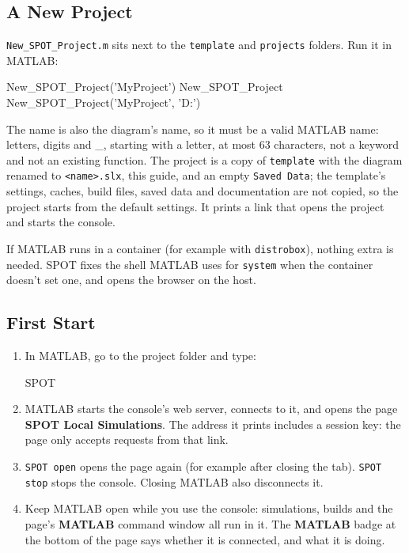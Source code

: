 \documentclass[11pt,a4paper]{article}
\newcommand{\ui}[1]{\textsf{\textbf{#1}}}
\newcommand{\pth}[1]{\texttt{#1}}
\newcommand{\fn}[1]{\texttt{#1}}
\begin{document}
\subsection{A New Project}\label{sec:newproject}
\fn{New\_SPOT\_Project.m} sits next to the \pth{template} and \pth{projects} folders. Run it in MATLAB:
\begin{matlab}
New_SPOT_Project('MyProject')              %
New_SPOT_Project                           %
New_SPOT_Project('MyProject', 'D:\SPOT')   %
\end{matlab}
The name is also the diagram's name, so it must be a valid MATLAB name: letters, digits and \_, starting with a
letter, at most 63 characters, not a keyword and not an existing function. The project is a copy of
\pth{template} with the diagram renamed to \pth{<name>.slx}, this guide, and an empty \pth{Saved Data}; the
template's settings, caches, build files, saved data and documentation are not copied, so the project starts from
the default settings. It prints a link that opens the project and starts the console.
\begin{tipbox}
If MATLAB runs in a container (for example with \pth{distrobox}), nothing extra is needed. SPOT fixes the shell
MATLAB uses for \fn{system} when the container doesn't set one, and opens the browser on the host.
\end{tipbox}

\subsection{First Start}\label{sec:firststart}
\begin{enumerate}
  \item In MATLAB, go to the project folder and type:
\begin{matlab}
SPOT          %
\end{matlab}
  \item MATLAB starts the console's web server, connects to it, and opens the page \ui{SPOT Local Simulations}.
        The address it prints includes a session key: the page only accepts requests from that link.
  \item \fn{SPOT open} opens the page again (for example after closing the tab). \fn{SPOT stop} stops the console.
        Closing MATLAB also disconnects it.
  \item Keep MATLAB open while you use the console: simulations, builds and the page's \ui{MATLAB} command window
        all run in it. The \ui{MATLAB} badge at the bottom of the page says whether it is connected, and what it is doing.
\end{enumerate}
\end{document}
